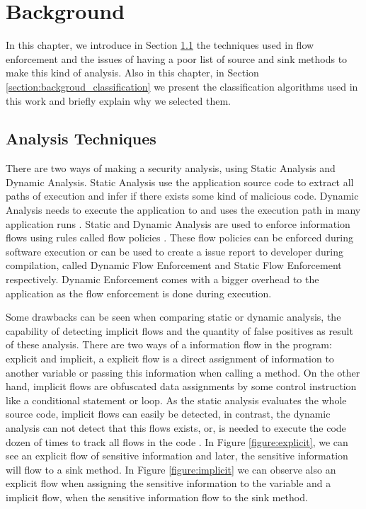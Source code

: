 \chapter{Background}\label{chapter:background}

In this chapter, we introduce in Section \ref{section:background_analysis} the techniques used in flow enforcement and the issues of having a poor list of source and sink methods to make this kind of analysis. Also in this chapter, in Section \ref{section:backgroud_classification} we present the classification algorithms used in this work and briefly explain why we selected them.

\section{Analysis Techniques}\label{section:background_analysis}

There are two ways of making a security analysis, using Static Analysis and Dynamic Analysis. Static Analysis use the application source code to extract all paths of execution and infer if there exists some kind of malicious code. Dynamic Analysis needs to execute the application to and uses the execution path in many application runs \citep{tam2017evolution}. Static and Dynamic Analysis are used to enforce information flows using rules called flow policies \citep{fernandes2016flowfence}. These flow policies can be enforced during software execution or can be used to create a issue report to developer during compilation, called Dynamic Flow Enforcement and Static Flow Enforcement respectively. Dynamic Enforcement comes with a bigger overhead to the application as the flow enforcement is done during execution.

Some drawbacks can be seen when comparing static or dynamic analysis, the capability of detecting implicit flows and the quantity of false positives as result of these analysis. There are two ways of a information flow in the program: explicit and implicit, a explicit flow is a direct assignment of information to another variable or passing this information when calling a method. On the other hand, implicit flows are obfuscated data assignments by some control instruction like a conditional statement or loop. As the static analysis evaluates the whole source code, implicit flows can easily be detected, in contrast, the dynamic analysis can not detect that this flows exists, or, is needed to execute the code dozen of times to track all flows in the code \citep{russo2010dynamic}. In Figure \ref{figure:explicit}, we can see an explicit flow of sensitive information and later, the sensitive information will flow to a sink method. In Figure \ref{figure:implicit} we can observe also an explicit flow when assigning the sensitive information to the variable and a implicit flow, when the sensitive information flow to the sink method.

